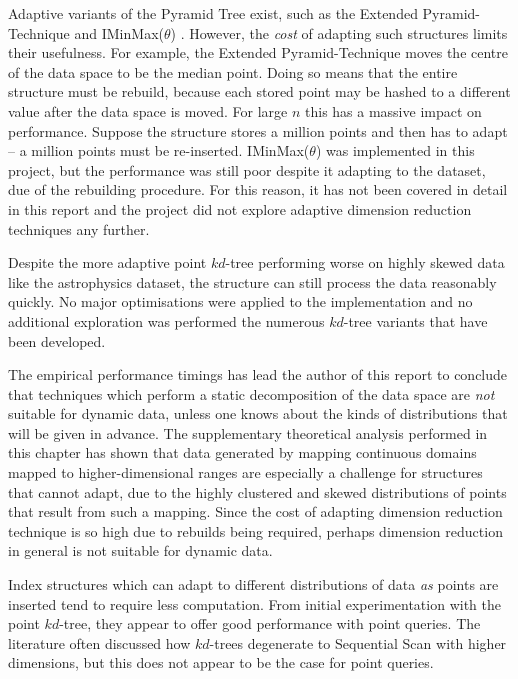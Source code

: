 Adaptive variants of the Pyramid Tree exist, such as the Extended Pyramid-Technique \cite{pyramid-tree} and IMinMax($\theta$) \cite{iminmax}. However, the \textit{cost} of adapting such structures limits their usefulness. For example, the Extended Pyramid-Technique moves the centre of the data space to be the median point. Doing so means that the entire structure must be rebuild, because each stored point may be hashed to a different value after the data space is moved. For large $n$ this has a massive impact on performance. Suppose the structure stores a million points and then has to adapt -- a million points must be re-inserted. IMinMax($\theta$) was implemented in this project, but the performance was still poor despite it adapting to the dataset, due of the rebuilding procedure. For this reason, it has not been covered in detail in this report and the project did not explore adaptive dimension reduction techniques any further.

Despite the more adaptive point $kd$-tree performing worse on highly skewed data like the astrophysics dataset, the structure can still process the data reasonably quickly. No major optimisations were applied to the implementation and no additional exploration was performed the numerous $kd$-tree variants that have been developed.

The empirical performance timings has lead the author of this report to conclude that techniques which perform a static decomposition of the data space are \textit{not} suitable for dynamic data, unless one knows about the kinds of distributions that will be given in advance. The supplementary theoretical analysis performed in this chapter has shown that data generated by mapping continuous domains mapped to higher-dimensional ranges are especially a challenge for structures that cannot adapt, due to the highly clustered and skewed distributions of points that result from such a mapping. Since the cost of adapting dimension reduction technique is so high due to rebuilds being required, perhaps dimension reduction in general is not suitable for dynamic data.

Index structures which can adapt to different distributions of data \textit{as} points are inserted tend to require less computation. From initial experimentation with the point $kd$-tree, they appear to offer good performance with point queries. The literature often discussed how $kd$-trees degenerate to Sequential Scan with higher dimensions, but this does not appear to be the case for point queries.


